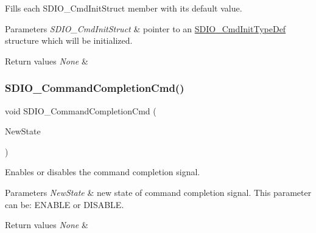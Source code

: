 Fills each S\+D\+I\+O\+\_\+\+Cmd\+Init\+Struct member with its default value. 


\begin{DoxyParams}{Parameters}
{\em S\+D\+I\+O\+\_\+\+Cmd\+Init\+Struct} & pointer to an \mbox{\hyperlink{struct_s_d_i_o___cmd_init_type_def}{S\+D\+I\+O\+\_\+\+Cmd\+Init\+Type\+Def}} structure which will be initialized. \\
\hline
\end{DoxyParams}

\begin{DoxyRetVals}{Return values}
{\em None} & \\
\hline
\end{DoxyRetVals}
\mbox{\label{group___s_d_i_o___private___functions_ga1bbe98c629812bc62121d9c8b2c5e21b}} 
\subsubsection{\texorpdfstring{SDIO\_CommandCompletionCmd()}{SDIO\_CommandCompletionCmd()}}
{\footnotesize\ttfamily void S\+D\+I\+O\+\_\+\+Command\+Completion\+Cmd (\begin{DoxyParamCaption}\item[{\mbox{\hyperlink{group___exported__types_gac9a7e9a35d2513ec15c3b537aaa4fba1}{Functional\+State}}}]{New\+State }\end{DoxyParamCaption})}



Enables or disables the command completion signal. 


\begin{DoxyParams}{Parameters}
{\em New\+State} & new state of command completion signal. This parameter can be\+: E\+N\+A\+B\+LE or D\+I\+S\+A\+B\+LE. \\
\hline
\end{DoxyParams}

\begin{DoxyRetVals}{Return values}
{\em None} & \\
\hline
\end{DoxyRetVals}
\mbox{\label{group___s_d_i_o___private___functions_gad65d896ae919683585bda44a1e2afae4}} 
